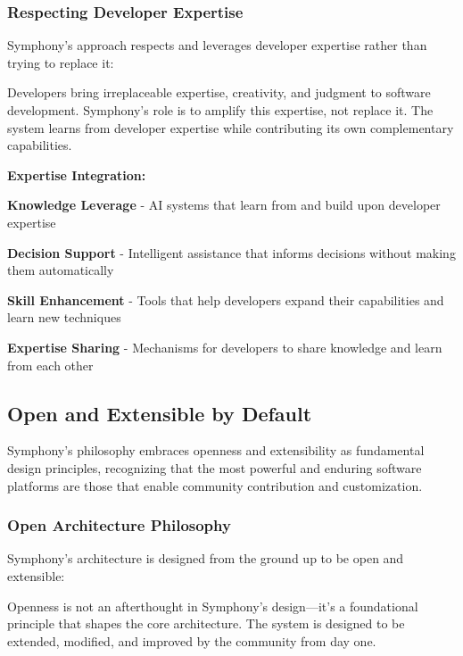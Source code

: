 \subsubsection{Respecting Developer Expertise}

Symphony's approach respects and leverages developer expertise rather than trying to replace it:

\begin{successbox}
Developers bring irreplaceable expertise, creativity, and judgment to software development. Symphony's role is to amplify this expertise, not replace it. The system learns from developer expertise while contributing its own complementary capabilities.
\end{successbox}

\textbf{Expertise Integration:}

\begin{compactlist}
    \item \textbf{Knowledge Leverage} - AI systems that learn from and build upon developer expertise
    \item \textbf{Decision Support} - Intelligent assistance that informs decisions without making them automatically
    \item \textbf{Skill Enhancement} - Tools that help developers expand their capabilities and learn new techniques
    \item \textbf{Expertise Sharing} - Mechanisms for developers to share knowledge and learn from each other
\end{compactlist}

\subsection{Open and Extensible by Default}
\label{subsec:open-extensible}

Symphony's philosophy embraces openness and extensibility as fundamental design principles, recognizing that the most powerful and enduring software platforms are those that enable community contribution and customization.

\subsubsection{Open Architecture Philosophy}

Symphony's architecture is designed from the ground up to be open and extensible:

\begin{infobox}[title=Openness as Foundation]
Openness is not an afterthought in Symphony's design—it's a foundational principle that shapes the core architecture. The system is designed to be extended, modified, and improved by the community from day one.
\end{infobox}

